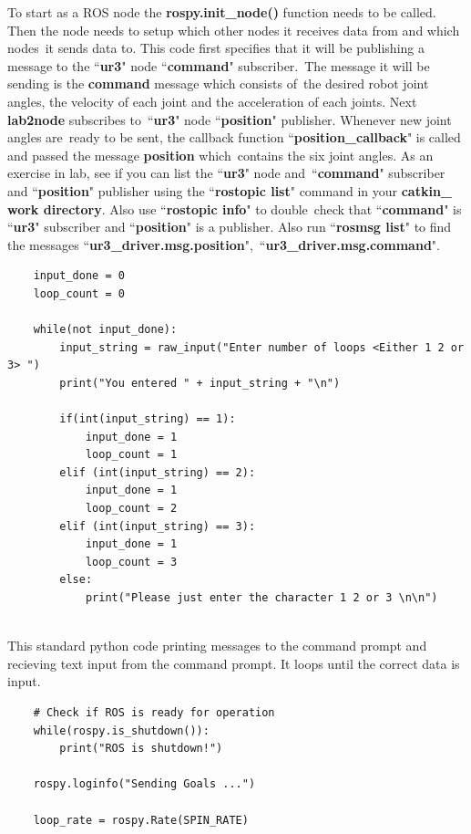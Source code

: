 To start as a ROS node the \textbf{rospy.init\_node()} function needs to be called.  Then the node needs to setup which other nodes it receives data from and which nodes\
it sends data to.  This code first specifies that it will be publishing a message to the ``\textbf{ur3}" node ``\textbf{command}" subscriber.\
The message it will be sending is the \textbf{command} message which consists of\
the desired robot joint angles, the velocity of each joint and the acceleration of each joints.  Next \textbf{lab2node} subscribes to\
``\textbf{ur3}" node ``\textbf{position}" publisher.  Whenever new joint angles are\
ready to be sent, the callback function ``\textbf{position\_callback}" is called and passed the message \textbf{position} which\
contains the six joint angles.
As an exercise in lab, see if you can list the ``\textbf{ur3}" node and\
``\textbf{command}" subscriber and ``\textbf{position}" publisher using the ``\textbf{rostopic list}" command in your \textbf{catkin\_ work directory}.  Also use ``\textbf{rostopic info}" to double\
check that ``\textbf{command}" is ``\textbf{ur3}" subscriber and ``\textbf{position}" is a publisher.  Also run ``\textbf{rosmsg list}" to find the messages ``\textbf{ur3\_driver.msg.position}",\
``\textbf{ur3\_driver.msg.command}".  

{\footnotesize
\begin{verbatim}   
    input_done = 0
    loop_count = 0

    while(not input_done):
        input_string = raw_input("Enter number of loops <Either 1 2 or 3> ")
        print("You entered " + input_string + "\n")

        if(int(input_string) == 1):
            input_done = 1
            loop_count = 1
        elif (int(input_string) == 2):
            input_done = 1
            loop_count = 2
        elif (int(input_string) == 3):
            input_done = 1
            loop_count = 3
        else:
            print("Please just enter the character 1 2 or 3 \n\n")
	
\end{verbatim}}

This standard python code printing messages to the command prompt and recieving text input from the command prompt.  It loops until the correct data is input. 

{\footnotesize
\begin{verbatim}
    # Check if ROS is ready for operation
    while(rospy.is_shutdown()):
        print("ROS is shutdown!")

    rospy.loginfo("Sending Goals ...")
	
    loop_rate = rospy.Rate(SPIN_RATE)
\end{verbatim}}

